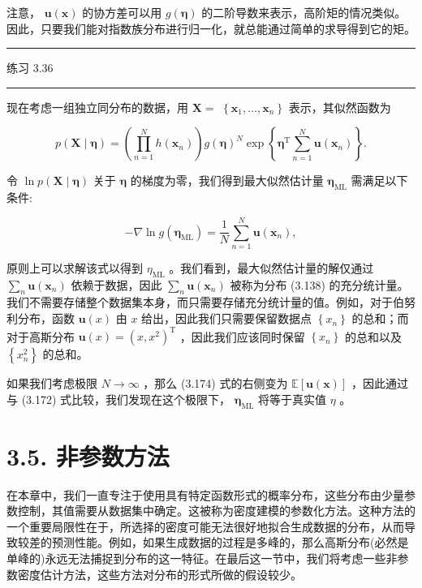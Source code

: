 \documentclass[10pt]{report}
\newcommand{\HRule}{\begin{center}\rule{0.9\linewidth}{0.2mm}\end{center}}
\begin{document}
注意， \(\mathbf{u}\left( \mathbf{x}\right)\) 的协方差可以用 \(g\left( \mathbf{\eta }\right)\) 的二阶导数来表示，高阶矩的情况类似。因此，只要我们能对指数族分布进行归一化，就总能通过简单的求导得到它的矩。

\HRule

练习 3.36

\HRule

现在考虑一组独立同分布的数据，用 \(\mathbf{X} =\)  \(\left\{  {{\mathbf{x}}_{1},\ldots ,{\mathbf{x}}_{n}}\right\}\) 表示，其似然函数为

\[
p\left( {\mathbf{X} \mid  \mathbf{\eta }}\right)  = \left( {\mathop{\prod }\limits_{{n = 1}}^{N}h\left( {\mathbf{x}}_{n}\right) }\right) g{\left( \mathbf{\eta }\right) }^{N}\exp \left\{  {{\mathbf{\eta }}^{\mathrm{T}}\mathop{\sum }\limits_{{n = 1}}^{N}\mathbf{u}\left( {\mathbf{x}}_{n}\right) }\right\}  . \tag{3.173}
\]

令 \(\ln p\left( {\mathbf{X} \mid  \mathbf{\eta }}\right)\) 关于 \(\mathbf{\eta }\) 的梯度为零，我们得到最大似然估计量 \({\mathbf{\eta }}_{\mathrm{{ML}}}\) 需满足以下条件:

\[
- \nabla \ln g\left( {\mathbf{\eta }}_{\mathrm{{ML}}}\right)  = \frac{1}{N}\mathop{\sum }\limits_{{n = 1}}^{N}\mathbf{u}\left( {\mathbf{x}}_{n}\right) , \tag{3.174}
\]

原则上可以求解该式以得到 \({\eta }_{\mathrm{{ML}}}\) 。我们看到，最大似然估计量的解仅通过 \(\mathop{\sum }\limits_{n}\mathbf{u}\left( {\mathbf{x}}_{n}\right)\) 依赖于数据，因此 \(\mathop{\sum }\limits_{n}\mathbf{u}\left( {\mathbf{x}}_{n}\right)\) 被称为分布 (3.138) 的充分统计量。我们不需要存储整个数据集本身，而只需要存储充分统计量的值。例如，对于伯努利分布，函数 \(\mathbf{u}\left( x\right)\) 由 \(x\) 给出，因此我们只需要保留数据点 \(\left\{  {x}_{n}\right\}\) 的总和；而对于高斯分布 \(\mathbf{u}\left( x\right)  = {\left( x,{x}^{2}\right) }^{\mathrm{T}}\) ，因此我们应该同时保留 \(\left\{  {x}_{n}\right\}\) 的总和以及 \(\left\{  {x}_{n}^{2}\right\}\) 的总和。

如果我们考虑极限 \(N \rightarrow  \infty\) ，那么 (3.174) 式的右侧变为 \(\mathbb{E}\left\lbrack  {\mathbf{u}\left( \mathbf{x}\right) }\right\rbrack\) ，因此通过与 (3.172) 式比较，我们发现在这个极限下， \({\mathbf{\eta }}_{\mathrm{{ML}}}\) 将等于真实值 \(\eta\) 。

\section*{3.5. 非参数方法}

在本章中，我们一直专注于使用具有特定函数形式的概率分布，这些分布由少量参数控制，其值需要从数据集中确定。这被称为密度建模的参数化方法。这种方法的一个重要局限性在于，所选择的密度可能无法很好地拟合生成数据的分布，从而导致较差的预测性能。例如，如果生成数据的过程是多峰的，那么高斯分布(必然是单峰的)永远无法捕捉到分布的这一特征。在最后这一节中，我们将考虑一些非参数密度估计方法，这些方法对分布的形式所做的假设较少。
\end{document}
